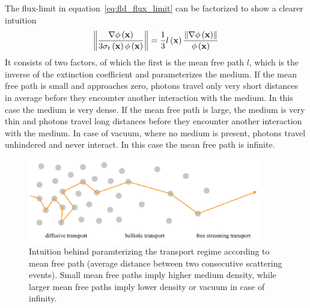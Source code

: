 The flux-limit in equation~\ref{eq:fld_flux_limit} can be factorized to show a clearer intuition
\begin{align}
\label{eq:flux_limit_factors}
\left\lVert
\frac{\nabla\phi\left(\boldsymbol{\mathbf{x}}\right)}{3\sigma_t\left(\boldsymbol{\mathbf{x}}\right)\phi\left(\boldsymbol{\mathbf{x}}\right)}
\right\rVert
=
\frac{1}{3}
l\left(\boldsymbol{\mathbf{x}}\right)
\frac{\left\lVert\nabla\phi\left(\boldsymbol{\mathbf{x}}\right)\right\rVert}{\phi\left(\boldsymbol{\mathbf{x}}\right)}
\end{align}
It consists of two factors, of which the first is the mean free path $l$, which is the inverse of the extinction coefficient and parameterizes the medium. If the mean free path is small and approaches zero, photons travel only very short distances in average before they encounter another interaction with the medium. In this case the medium is very dense. If the mean free path is large, the medium is very thin and photons travel long distances before they encounter another interaction with the medium. In case of vacuum, where no medium is present, photons travel unhindered and never interact. In this case the mean free path is infinite.
\begin{figure}[h]
\centering
\includegraphics[width=0.9\textwidth]{06_fld/figures/fig_transport_regimes_mfp.pdf}
\caption{Intuition behind paramterizing the transport regime according to mean free path (average distance between two consecutive scattering events). Small mean free paths imply higher medium density, while larger mean free paths imply lower density or vacuum in case of infinity.}
\label{fig:fld_transport_regimes_mfp}
\end{figure}



